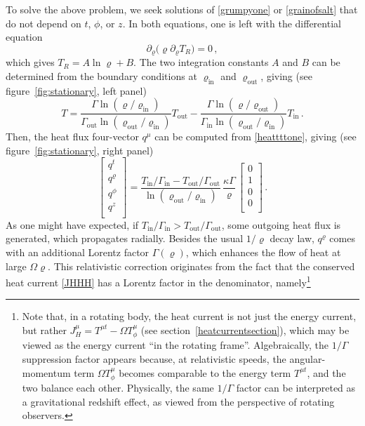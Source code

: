 \documentclass[a4paper, amsfonts, amssymb, amsmath, reprint, showkeys, nofootinbib, twoside, onecolumn,notitlepage]{revtex4-1}
\theoremstyle{definition}
\theoremstyle{theorem}
\begin{document}
To solve the above problem, we seek solutions of \eqref{grumpyone} or \eqref{grainofsalt} that do not depend on $t$, $\phi$, or $z$. In both equations, one is left with the differential equation
\begin{equation}
\partial_\varrho \big( \varrho \partial_\varrho T_R\big)=0 \, ,
\end{equation}
which gives $T_R=A\ln\varrho +B$. The two integration constants $A$ and $B$ can be determined from the boundary conditions at $\varrho_{\text{in}}$ and $\varrho_{\text{out}}$, giving (see figure~\ref{fig:stationary}, left panel)
\begin{equation}\label{ToutTin}
T= \dfrac{\Gamma\ln(\varrho/\varrho_{\text{in}})}{\Gamma_{\text{out}} \ln(\varrho_{\text{out}}/\varrho_{\text{in}})}T_{\text{out}} - \dfrac{\Gamma \ln(\varrho/\varrho_{\text{out}})}{\Gamma_{\text{in}}\ln(\varrho_{\text{out}}/\varrho_{\text{in}})} T_{\text{in}} \, .
\end{equation}
Then, the heat flux four-vector $q^\mu$ can be computed from \eqref{heattttone}, giving (see figure~\ref{fig:stationary}, right panel)
\begin{equation}\label{OhmacheHeat!}
\begin{bmatrix}
q^t \\
q^\varrho \\
q^\phi \\
q^z \\
\end{bmatrix}= \dfrac{T_{\text{in}}/\Gamma_{\text{in}}{-}T_{\text{out}}/\Gamma_{\text{out}}}{\ln(\varrho_{\text{out}}/\varrho_{\text{in}})} \, \dfrac{\kappa \Gamma}{\varrho} \,
\begin{bmatrix}
0\\
1\\
0\\
0\\
\end{bmatrix} \, .
\end{equation}
As one might have expected, if $T_{\text{in}}/\Gamma_{\text{in}}> T_{\text{out}}/\Gamma_{\text{out}}$, some outgoing heat flux is generated, which propagates radially. Besides the usual $1/\varrho$ decay law, $q^\varrho$ comes with an additional Lorentz factor $\Gamma(\varrho)$, which enhances the flow of heat at large $\Omega\varrho$. This relativistic correction originates from the fact that the conserved heat current \eqref{JHHH} has a Lorentz factor in the denominator, namely\footnote{Note that, in a rotating body, the heat current is not just the energy current, but rather $J_H^\mu =T^{\mu t}-\Omega T^\mu_\phi$ (see section~\ref{heatcurrentsection}), which may be viewed as the energy current ``in the rotating frame''. Algebraically, the $1/\Gamma$ suppression factor appears because, at relativistic speeds, the angular-momentum term $\Omega T^\mu_\phi$ becomes comparable to the energy term $T^{\mu t}$, and the two balance each other. Physically, the same $1/\Gamma$ factor can be interpreted as a gravitational redshift effect, as viewed from the perspective of rotating observers.}
\end{document}

